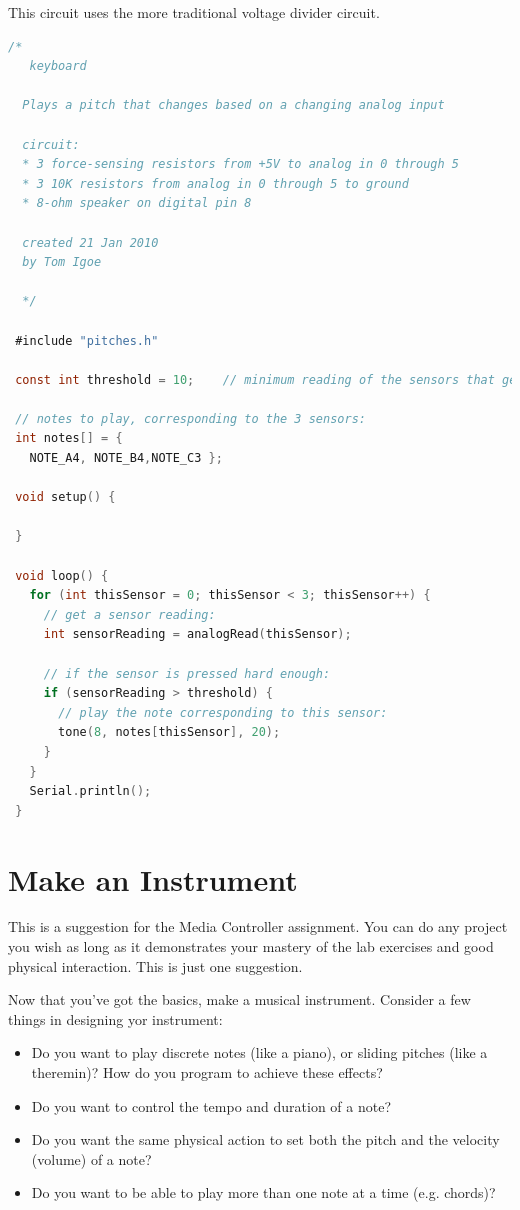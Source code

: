 This circuit uses the more traditional voltage divider circuit.
\begin{lstlisting}[language=C]
 /*
   keyboard
  
  Plays a pitch that changes based on a changing analog input
  
  circuit:
  * 3 force-sensing resistors from +5V to analog in 0 through 5
  * 3 10K resistors from analog in 0 through 5 to ground
  * 8-ohm speaker on digital pin 8
  
  created 21 Jan 2010
  by Tom Igoe 
  
  */

 #include "pitches.h"

 const int threshold = 10;    // minimum reading of the sensors that generates a note

 // notes to play, corresponding to the 3 sensors:
 int notes[] = {
   NOTE_A4, NOTE_B4,NOTE_C3 };

 void setup() {

 }

 void loop() {
   for (int thisSensor = 0; thisSensor < 3; thisSensor++) {
     // get a sensor reading:
     int sensorReading = analogRead(thisSensor);

     // if the sensor is pressed hard enough:
     if (sensorReading > threshold) {
       // play the note corresponding to this sensor:
       tone(8, notes[thisSensor], 20);
     } 
   }
   Serial.println();
 }
\end{lstlisting}

\section{Make an Instrument}

This is a suggestion for the Media Controller assignment. You can do any project you wish as long as it demonstrates your mastery of the lab exercises and good physical interaction. This is just one suggestion.

Now that you've got the basics, make a musical instrument. Consider a few things in designing yor instrument:

\begin{itemize}
\item Do you want to play discrete notes (like a piano), or sliding pitches (like a theremin)? How do you program to achieve these effects?
\item Do you want to control the tempo and duration of a note?
\item Do you want the same physical action to set both the pitch and the velocity (volume) of a note?
\item Do you want to be able to play more than one note at a time (e.g. chords)?
\end{itemize}

